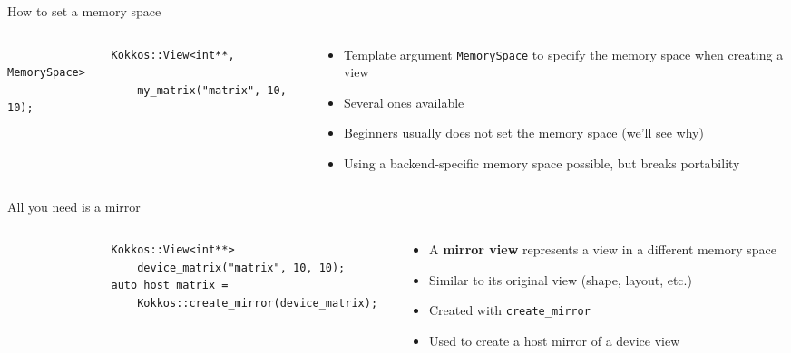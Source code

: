 \documentclass[aspectratio=169]{beamer}
\newcommand{\highlight}[1]{\textcolor{main}{\textbf{#1}}}
\begin{document}

\begin{frame}[fragile]{How to set a memory space}
    \begin{columns}
        \begin{column}{0.5\linewidth}
            \begin{verbatim}
                Kokkos::View<int**, MemorySpace>
                    my_matrix("matrix", 10, 10);
            \end{verbatim}
        \end{column}
        \begin{column}{0.5\linewidth}
            \begin{itemize}
                \item Template argument \texttt{MemorySpace} to specify the memory space when creating a view
                \item Several ones available
                \item Beginners usually does not set the memory space (we'll see why)
                \item Using a backend-specific memory space possible, but breaks portability
            \end{itemize}
        \end{column}
    \end{columns}
\end{frame}


\begin{frame}[fragile]{All you need is a mirror}
    \begin{columns}
        \begin{column}{0.6\linewidth}
            \begin{verbatim}
                Kokkos::View<int**>
                    device_matrix("matrix", 10, 10);
                auto host_matrix =
                    Kokkos::create_mirror(device_matrix);
            \end{verbatim}

        \end{column}
        \begin{column}{0.4\linewidth}
            \begin{itemize}
                \item A \highlight{mirror view} represents a view in a different memory space
                \item Similar to its original view (shape, layout, etc.)
                \item Created with \texttt{create\_mirror}
                \item Used to create a host mirror of a device view
            \end{itemize}
        \end{column}
    \end{columns}
\end{frame}
\end{document}
